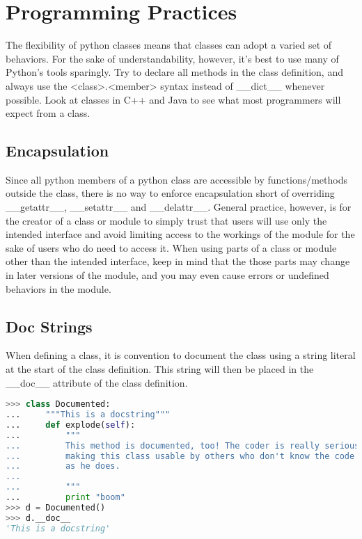\section{Programming Practices}
The flexibility of python classes means that classes can adopt a varied set of
behaviors. For the sake of understandability, however, it's best to use many of
Python's tools sparingly. Try to declare all methods in the class definition,
and always use the <class>.<member> syntax instead of \_\_dict\_\_ whenever
possible. Look at classes in C++ and Java to see what most programmers will
expect from a class.

\subsection{Encapsulation}
Since all python members of a python class are accessible by functions/methods
outside the class, there is no way to enforce encapsulation short of overriding
\_\_getattr\_\_, \_\_setattr\_\_ and \_\_delattr\_\_. General practice, however,
is for the creator of a class or module to simply trust that users will use only
the intended interface and avoid limiting access to the workings of the module
for the sake of users who do need to access it. When using parts of a class or
module other than the intended interface, keep in mind that the those parts may
change in later versions of the module, and you may even cause errors or
undefined behaviors in the module.

\subsection{Doc Strings}
When defining a class, it is convention to document the class using a string
literal at the start of the class definition. This string will then be placed in
the \_\_doc\_\_ attribute of the class definition.
\lstset{basicstyle=\scriptsize, numbers=left, captionpos=b, tabsize=4}
\begin{lstlisting}[caption=Doc String Example,language={Python},
xleftmargin=15pt, label=lst:Doc String Example]
>>> class Documented:
...     """This is a docstring"""
...     def explode(self):
...         """
...         This method is documented, too! The coder is really serious about
...         making this class usable by others who don't know the code as well
...         as he does.
...
...         """
...         print "boom"
>>> d = Documented()
>>> d.__doc__
'This is a docstring'
\end{lstlisting}

